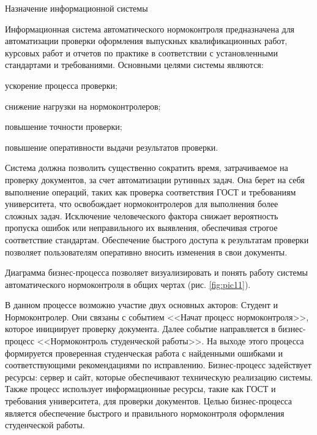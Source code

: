 \documentclass{report}
\begin{document}
Назначение информационной системы

Информационная система автоматического нормоконтроля предназначена для автоматизации проверки оформления выпускных квалификационных работ, курсовых работ и отчетов по практике в соответствии с установленными стандартами и требованиями. 
Основными целями системы являются:
\begin{enummarker}
\item ускорение процесса проверки;
\item снижение нагрузки на нормоконтролеров;
\item повышение точности проверки;
\item повышение оперативности выдачи результатов проверки.
\end{enummarker}

Система должна позволить существенно сократить время, затрачиваемое на проверку документов, за счет автоматизации рутинных задач. Она берет на себя выполнение операций, таких как проверка соответствия ГОСТ и требованиям университета, что освобождает нормоконтролеров для выполнения более сложных задач. Исключение человеческого фактора снижает вероятность пропуска ошибок или неправильного их выявления, обеспечивая строгое соответствие стандартам. Обеспечение быстрого доступа к результатам проверки позволяет пользователям оперативно вносить изменения в свои документы.



Диаграмма бизнес-процесса позволяет визуализировать и понять работу системы автоматического нормоконтроля в общих чертах (рис. \ref{fig:pic11}).


В данном процессе возможно участие двух основных акторов: Студент и Нормоконтролер. Они связаны с событием <<Начат процесс нормоконтроля>>, которое инициирует проверку документа. Далее событие направляется в бизнес-процесс <<Нормоконтроль студенческой работы>>. На выходе этого процесса формируется проверенная студенческая работа с найденными ошибками и соответствующими рекомендациями по исправлению. Бизнес-процесс задействует ресурсы: сервер и сайт, которые обеспечивают техническую реализацию системы. Также процесс использует информационные ресурсы, такие как ГОСТ и требования университета, для проверки документов. Целью бизнес-процесса является обеспечение быстрого и правильного нормоконтроля оформления студенческой работы.
\end{document}
